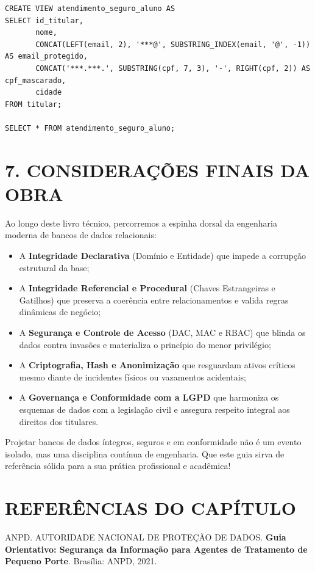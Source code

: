 \begin{lstlisting}
CREATE VIEW atendimento_seguro_aluno AS
SELECT id_titular,
       nome,
       CONCAT(LEFT(email, 2), '***@', SUBSTRING_INDEX(email, '@', -1)) AS email_protegido,
       CONCAT('***.***.', SUBSTRING(cpf, 7, 3), '-', RIGHT(cpf, 2)) AS cpf_mascarado,
       cidade
FROM titular;

SELECT * FROM atendimento_seguro_aluno;
\end{lstlisting}

\newpage

\section*{7. CONSIDERAÇÕES FINAIS DA OBRA}

Ao longo deste livro técnico, percorremos a espinha dorsal da engenharia moderna de bancos de dados relacionais:
\begin{itemize}
    \item A \textbf{Integridade Declarativa} (Domínio e Entidade) que impede a corrupção estrutural da base;
    \item A \textbf{Integridade Referencial e Procedural} (Chaves Estrangeiras e Gatilhos) que preserva a coerência entre relacionamentos e valida regras dinâmicas de negócio;
    \item A \textbf{Segurança e Controle de Acesso} (DAC, MAC e RBAC) que blinda os dados contra invasões e materializa o princípio do menor privilégio;
    \item A \textbf{Criptografia, Hash e Anonimização} que resguardam ativos críticos mesmo diante de incidentes físicos ou vazamentos acidentais;
    \item A \textbf{Governança e Conformidade com a LGPD} que harmoniza os esquemas de dados com a legislação civil e assegura respeito integral aos direitos dos titulares.
\end{itemize}

Projetar bancos de dados íntegros, seguros e em conformidade não é um evento isolado, mas uma disciplina contínua de engenharia. Que este guia sirva de referência sólida para a sua prática profissional e acadêmica!

\section*{REFERÊNCIAS DO CAPÍTULO}

\noindent ANPD. AUTORIDADE NACIONAL DE PROTEÇÃO DE DADOS. \textbf{Guia Orientativo: Segurança da Informação para Agentes de Tratamento de Pequeno Porte}. Brasília: ANPD, 2021.

